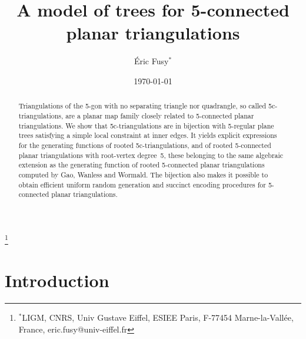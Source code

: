 \documentclass[letter]{amsart}
\numberwithin{theo}{section}
\theoremstyle{remark}
\begin{document}
\author[\'Eric Fusy]{\'{E}ric Fusy$^{*}$}
\thanks{$^{*}$LIGM, CNRS, Univ Gustave Eiffel, ESIEE Paris, F-77454 Marne-la-Vall\'ee, France, eric.fusy@univ-eiffel.fr}


\title[A model of trees for 5-connected planar triangulations]{A model of trees for 5-connected planar  triangulations}
\date{\today}



\begin{abstract}
Triangulations of the 5-gon with no separating triangle nor quadrangle, so called 5c-triangulations, are a planar map family closely related to 5-connected planar triangulations. We show that 5c-triangulations are in bijection with 5-regular plane trees satisfying a simple local constraint at inner edges. It yields explicit expressions for the generating functions of rooted 5c-triangulations, and of rooted 5-connected planar triangulations with root-vertex degree~5, these belonging to the same algebraic extension as the generating function of rooted 5-connected planar triangulations computed by Gao, Wanless and Wormald. The bijection also makes it possible to obtain efficient uniform random generation and succinct encoding procedures for 5-connected planar triangulations.
\end{abstract}

\maketitle



\section{Introduction}\label{sec:intro}
\end{document}
